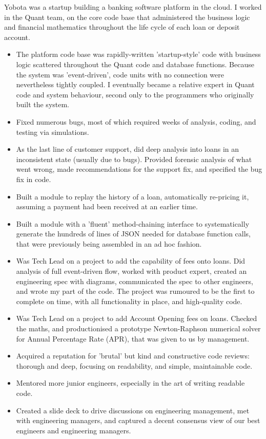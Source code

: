 \documentclass[11pt,a4paper,sans]{moderncv} %
\begin{document}
{Yobota was a startup building a banking software platform in the cloud.  I worked in the Quant team, on the core code base that administered the business logic and financial mathematics throughout the life cycle of each loan or deposit account.
\begin{itemize}
    \item The platform code base was rapidly-written 'startup-style' code with business logic scattered throughout the Quant code and database functions. Because the system was 'event-driven', code units with no connection were nevertheless tightly coupled.  I eventually became a relative expert in Quant code and system behaviour, second only to the programmers who originally built the system.
    \item Fixed numerous bugs, most of which required weeks of analysis, coding, and testing via simulations.
    \item As the last line of customer support, did deep analysis into loans in an inconsistent state (usually due to bugs).  Provided forensic analysis of what went wrong, made recommendations for the support fix, and specified the bug fix in code.
    \item Built a module to replay the history of a loan, automatically re-pricing it, assuming a payment had been received at an earlier time.
    \item Built a module with a 'fluent' method-chaining interface to systematically generate the hundreds of lines of JSON needed for database function calls, that were previously being assembled in an ad hoc fashion.
    \item  Was Tech Lead on a project to add the capability of fees onto loans.  Did analysis of full event-driven flow, worked with product expert, created an engineering spec with diagrams, communicated the spec to other engineers, and wrote my part of the code.  The project was rumoured to be the first to complete on time, with all functionality in place, and high-quality code.
    \item Was Tech Lead on a project to add Account Opening fees on loans.  Checked the maths, and productionised a prototype Newton-Raphson numerical solver for Annual Percentage Rate (APR), that was given to us by management.
    \item Acquired a reputation for 'brutal' but kind and constructive code reviews: thorough and deep, focusing on readability, and simple, maintainable code.
    \item Mentored more junior engineers, especially in the art of writing readable code.
    \item Created a slide deck to drive discussions on engineering management, met with engineering managers, and captured a decent consensus view of our best engineers and engineering managers.
\end{itemize}
}
\end{document}
